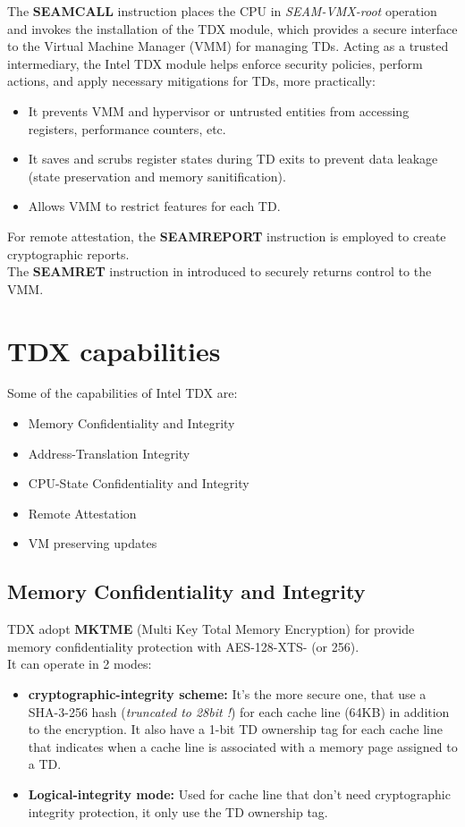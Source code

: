 The \textbf{SEAMCALL} instruction places the CPU in
\textit{SEAM-VMX-root} operation and invokes the installation of the
TDX module, which provides a secure interface to the Virtual Machine
Manager (VMM) for managing TDs. Acting as a trusted intermediary, the
Intel TDX module helps enforce security policies, perform actions, and
apply necessary mitigations for TDs, more practically:
\begin{itemize}
  \item It prevents VMM and hypervisor or untrusted entities from
    accessing registers, performance counters, etc.
  \item It saves and scrubs register states during TD exits to prevent
    data leakage (state preservation and memory sanitification).
  \item Allows VMM to restrict features for each TD.
\end{itemize}

For remote attestation, the \textbf{SEAMREPORT} instruction is
employed to create cryptographic reports. \\ 
The \textbf{SEAMRET} instruction in introduced to securely returns
control to the VMM.


\section{TDX capabilities}
Some of the capabilities of Intel TDX are:
\begin{itemize}
  \item Memory Confidentiality and Integrity
  \item Address-Translation Integrity
  \item CPU-State Confidentiality and Integrity
  \item Remote Attestation
  \item VM preserving updates
\end{itemize}

\subsection{Memory Confidentiality and Integrity}
TDX adopt \textbf{MKTME} (Multi Key Total Memory Encryption) for
provide memory confidentiality protection with AES-128-XTS- (or
256).\\
It can operate in 2 modes:
\begin{itemize}
  \item \textbf{cryptographic-integrity scheme:} It's the more secure
    one, that use a SHA-3-256 hash (\textit{truncated to 28bit !}) for
    each cache line (64KB) in addition to the encryption. It also have
    a 1-bit TD ownership tag for each cache line that indicates when a
    cache line is associated with a memory page assigned to a TD.
  \item \textbf{Logical-integrity mode:} Used for cache line that
    don't need cryptographic integrity protection, it only use the TD
    ownership tag.
\end{itemize}

